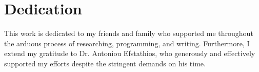 \thispagestyle{empty} %
\chapter*{Dedication}

This work is dedicated to my friends and family who supported me throughout the arduous process of researching, programming, and writing. Furthermore, I extend my gratitude to Dr. Antoniou Efstathios, who generously and effectively supported my efforts despite the stringent demands on his time.
